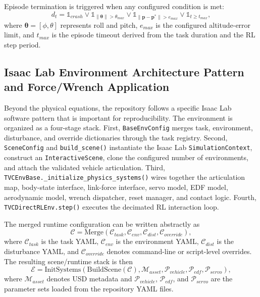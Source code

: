\documentclass[10pt,twocolumn]{article}
\begin{document}
Episode termination is triggered when any configured condition is met:
\begin{equation}
d_t =
\mathbb{1}_{crash}
\vee
\mathbb{1}_{\|\boldsymbol{\theta}\| > \theta_{max}}
\vee
\mathbb{1}_{\|\mathbf{p}-\mathbf{p}^{*}\| > e_{max}}
\vee
\mathbb{1}_{t \geq t_{max}},
\label{eq:termination}
\end{equation}
where $\boldsymbol{\theta}=[\phi,\theta]$ represents roll and pitch, $e_{max}$ is the configured altitude-error limit, and $t_{max}$ is the episode timeout derived from the task duration and the RL step period.

\subsection{Isaac Lab Environment Architecture Pattern and Force/Wrench Application}

Beyond the physical equations, the repository follows a specific Isaac Lab software pattern that is important for reproducibility. The environment is organized as a four-stage stack. First, \texttt{BaseEnvConfig} merges task, environment, disturbance, and override dictionaries through the task registry. Second, \texttt{SceneConfig} and \texttt{build\_scene()} instantiate the Isaac Lab \texttt{SimulationContext}, construct an \texttt{InteractiveScene}, clone the configured number of environments, and attach the validated vehicle articulation. Third, \texttt{TVCEnvBase.\_initialize\_physics\_systems()} wires together the articulation map, body-state interface, link-force interface, servo model, EDF model, aerodynamic model, wrench dispatcher, reset manager, and contact logic. Fourth, \texttt{TVCDirectRLEnv.step()} executes the decimated RL interaction loop.

The merged runtime configuration can be written abstractly as
\begin{equation}
\mathcal{C}
=
\mathrm{Merge}\!\left(
\mathcal{C}_{task},
\mathcal{C}_{env},
\mathcal{C}_{dist},
\mathcal{C}_{override}
\right),
\label{eq:config_merge}
\end{equation}
where $\mathcal{C}_{task}$ is the task YAML, $\mathcal{C}_{env}$ is the environment YAML, $\mathcal{C}_{dist}$ is the disturbance YAML, and $\mathcal{C}_{override}$ denotes command-line or script-level overrides. The resulting scene/runtime stack is then
\begin{equation}
\mathcal{E}
=
\mathrm{InitSystems}\!\left(
\mathrm{BuildScene}(\mathcal{C}),
\mathcal{M}_{asset},
\mathcal{P}_{vehicle},
\mathcal{P}_{edf},
\mathcal{P}_{servo}
\right),
\label{eq:env_stack}
\end{equation}
where $\mathcal{M}_{asset}$ denotes USD metadata and $\mathcal{P}_{vehicle}$, $\mathcal{P}_{edf}$, and $\mathcal{P}_{servo}$ are the parameter sets loaded from the repository YAML files.
\end{document}
